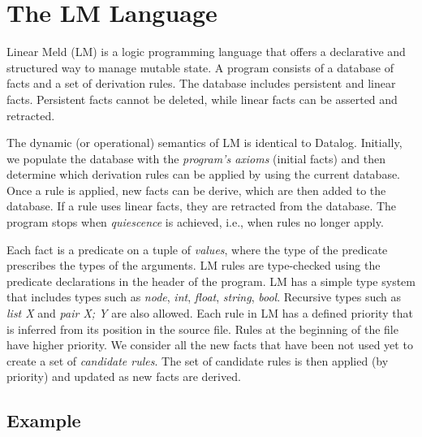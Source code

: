 \newcommand{\selector}[0]{[~S~\Rightarrow~y;~BE~] \lolli HE}
\newcommand{\comprehension}[0]{\{~\widehat{x};~BE;~SH~\}}
\newcommand{\aggregate}[0]{[~A~\Rightarrow~y;~\widehat{x};~BE;~SH_1;~SH_2~]}


\section{The LM Language}
\label{lm_language}

Linear Meld (LM) is a logic programming language that offers a
declarative and structured way to manage mutable state.  A program consists of
a database of facts and a set of derivation rules. The database
includes persistent and linear facts. Persistent facts cannot be
deleted, while linear facts can be asserted and retracted.

The dynamic (or operational) semantics of LM is identical to
Datalog. Initially, we populate the database with the \emph{program's axioms} (initial facts)
and then determine which derivation rules can be applied by
using the current database. Once a rule is applied, new facts can be
derive, which are then added to the database. If a rule uses linear
facts, they are retracted from the database. The program stops when
\emph{quiescence} is achieved, i.e., when rules no longer apply.

Each fact is a predicate on a tuple of \emph{values}, where the type
of the predicate prescribes the types of the arguments.  LM rules are
type-checked using the predicate declarations in the header of the
program. LM has a simple type system that includes types such as
\emph{node}, \emph{int}, \emph{float}, \emph{string},
\emph{bool}. Recursive types such as \emph{list X} and \emph{pair X;
  Y} are also allowed.  Each rule in LM has a defined priority that is
inferred from its position in the source file.  Rules at the beginning
of the file have higher priority.
We consider all the new facts that have been not used yet to create a
set of \emph{candidate rules}.
The set of candidate rules is then applied (by priority)
and updated as new facts are derived.


\subsection{Example}


